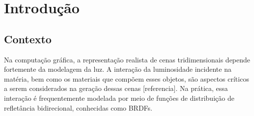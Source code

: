 \documentclass[english, 
               brazil, 
               bsc] %
               {dcomp-abntex2}
\begin{document}

\frenchspacing 


\pretextual


\inserirInformacoesPDF

\imprimircapa
\imprimirfolhaderosto*








\mostrarlistadeILUSTRACOES
\mostrarlistadeQUADROS
\mostrarlistadeTABELAS
\mostrarlistadeCODIGOS
\mostrarlistadeALGORITMOS
 


    
\mostrarSUMARIO


\textual

\chapter{Introdução}


\section{Contexto}

Na computação gráfica, a representação realista de cenas tridimensionais depende fortemente da modelagem da luz. A interação da luminosidade incidente na matéria, bem como os materiais que compõem esses objetos, são aspectos críticos a serem considerados na geração dessas cenas [referencia]. Na prática, essa interação é frequentemente modelada por meio de funções de distribuição de refletância bidirecional, conhecidas como BRDFs.
\end{document}
